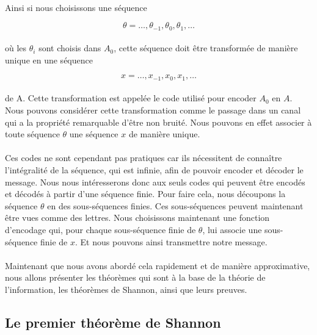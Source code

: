 	\paragraph{}
	Ainsi si nous choisissons une séquence

	\[\theta = \dots,\theta_{-1},\theta_{0},\theta_{1},\dots\]

	\paragraph{}
	où les $\theta_i$ sont choisis dans $A_0$, cette séquence doit être
	transformée de manière unique en une séquence

	\[x = \dots,x_{-1},x_{0},x_{1},\dots\]

	\paragraph{}
	de A. Cette transformation est appelée le code utilisé pour encoder $A_0$
	en $A$. Nous pouvons considérer cette transformation comme le passage dans
	un canal qui a la propriété remarquable d'être non bruité. Nous pouvons en
	effet associer à toute séquence $\theta$ une séquence $x$ 
	de manière unique. 

	\paragraph{}
	Ces codes ne sont cependant pas pratiques car ils nécessitent de connaître
	l'intégralité de la séquence, qui est infinie, afin de pouvoir encoder et 
	décoder le message. Nous  nous intéresserons donc aux seuls codes qui
	peuvent être encodés et décodés à partir d'une séquence finie. Pour faire
	cela, nous découpons la séquence $\theta$ en des sous-séquences finies. 
	Ces sous-séquences peuvent maintenant être vues comme des lettres. Nous
	choisissons maintenant une fonction d'encodage qui, pour chaque 
	sous-séquence finie de $\theta$, lui associe une sous-séquence finie
	de $x$. Et nous pouvons ainsi transmettre notre message.
	
	\paragraph{}
	Maintenant que nous avons abordé cela rapidement et de manière 
	approximative, nous allons présenter les théorèmes qui sont à la base
	de la théorie de l'information, les théorèmes
	de Shannon, ainsi que leurs preuves.

\subsection{Le premier théorème de Shannon}

